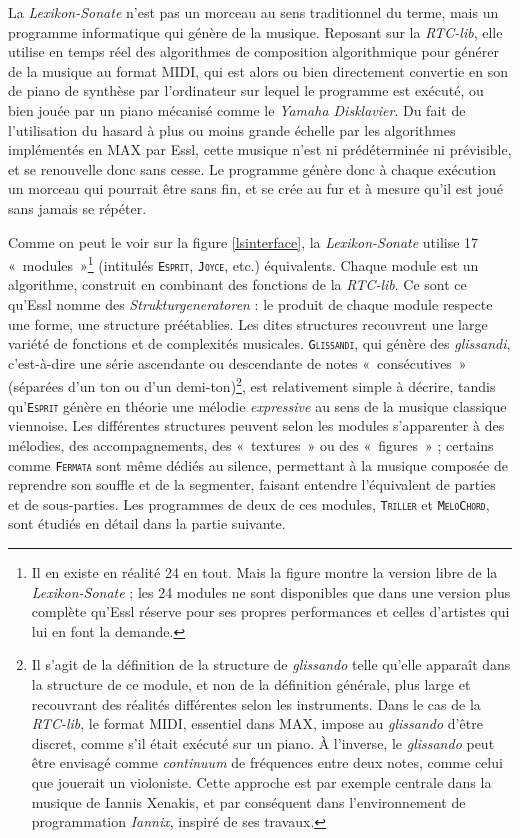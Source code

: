 \documentclass[a4paper,12pt]{article}
\newcommand{\guill}[1]{«~#1~»}
\newcommand{\module}[1]{\texttt{\textsc{#1}}}
\begin{document}
La \emph{Lexikon-Sonate} n'est pas un morceau au sens traditionnel du terme, mais un programme informatique qui génère de la musique. Reposant sur la \emph{RTC-lib}, elle utilise en temps réel des algorithmes de composition algorithmique pour générer de la musique au format MIDI, qui est alors ou bien directement convertie en son de piano de synthèse par l'ordinateur sur lequel le programme est exécuté, ou bien jouée par un piano mécanisé comme le \emph{Yamaha Disklavier}. Du fait de l'utilisation du hasard à plus ou moins grande échelle par les algorithmes implémentés en MAX par Essl, cette musique n'est ni prédéterminée ni prévisible, et se renouvelle donc sans cesse. Le programme génère donc à chaque exécution un morceau qui pourrait être sans fin, et se crée au fur et à mesure qu'il est joué sans jamais se répéter.

Comme on peut le voir sur la figure \ref{lsinterface}, la \emph{Lexikon-Sonate} utilise 17 \guill{modules}\footnote{Il en existe en réalité 24 en tout. Mais la figure montre la version libre de la \emph{Lexikon-Sonate} ; les 24 modules ne sont disponibles que dans une version plus complète qu'Essl réserve pour ses propres performances et celles d'artistes qui lui en font la demande.} (intitulés \module{Esprit}, \module{Joyce}, etc.) équivalents. Chaque module est un algorithme, construit en combinant des fonctions de la \emph{RTC-lib}. Ce sont ce qu'Essl nomme des \emph{Strukturgeneratoren} : le produit de chaque module respecte une forme, une structure préétablies. Les dites structures recouvrent une large variété de fonctions et de complexités musicales. \texttt{\textsc{Glissandi}}, qui génère des \emph{glissandi}, c'est-à-dire une série ascendante ou descendante de notes \guill{consécutives} (séparées d'un ton ou d'un demi-ton)\footnote{Il s'agit de la définition de la structure de \emph{glissando} telle qu'elle apparaît dans la structure de ce module, et non de la définition générale, plus large et recouvrant des réalités différentes selon les instruments. Dans le cas de la \emph{RTC-lib}, le format MIDI, essentiel dans MAX, impose au \emph{glissando} d'être discret, comme s'il était exécuté sur un piano. À l'inverse, le \emph{glissando} peut être envisagé comme \emph{continuum} de fréquences entre deux notes, comme celui que jouerait un violoniste. Cette approche est par exemple centrale dans la musique de Iannis Xenakis, et par conséquent dans l'environnement de programmation \emph{Iannix}, inspiré de ses travaux.}, est relativement simple à décrire, tandis qu'\texttt{\textsc{Esprit}} génère en théorie une mélodie \emph{expressive} au sens de la musique classique viennoise. Les différentes structures peuvent selon les modules s'apparenter à des mélodies, des accompagnements, des \guill{textures} ou des \guill{figures} ; certains comme \texttt{\textsc{Fermata}} sont même dédiés au silence, permettant à la musique composée de reprendre son souffle et de la segmenter, faisant entendre l'équivalent de parties et de sous-parties. Les programmes de deux de ces modules, \module{Triller} et \module{MeloChord}, sont étudiés en détail dans la partie suivante.
\end{document}
